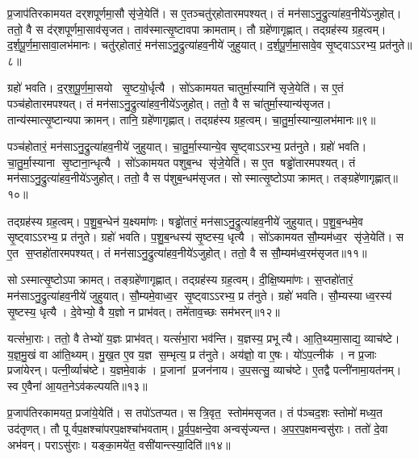 प्र॒जाप॑तिरकामयत दर्‌शपूर्णमा॒सौ सृ॑जे॒येति॑। स ए॒तञ्चतु॑र्‌होतारमपश्यत्। तं मन॑साऽनु॒द्रुत्या॑हव॒नीये॑ऽजुहोत्। ततो॒ वै स द॑र्‌शपूर्णमा॒साव॑सृजत। ताव॑स्मात्सृ॒ष्टावपाक्रामताम्। तौ ग्रहे॑णागृह्णात्। तद्ग्रह॑स्य ग्रह॒त्वम्। द॒र्श॒पू॒र्ण॒मा॒सावा॒लभ॑मानः। चतु॑र्‌होतारं॒ मन॑साऽनु॒द्रुत्या॑हव॒नीये॑ जुहुयात्। द॒र्श॒पू॒र्ण॒मा॒सावे॒व सृ॒ष्ट्वाऽऽरभ्य॒ प्रत॑नुते॥८॥

ग्रहो॑ भवति। द॒र्‌श॒पू॒र्ण॒मा॒सयो सृ॒ष्टयो॒र्धृत्यै। सो॑ऽकामयत चातुर्मा॒स्यानि॑ सृजे॒येति॑। स ए॒तं पञ्च॑होतारमपश्यत्। तं मन॑साऽनु॒द्रुत्या॑हव॒नीये॑ऽजुहोत्। ततो॒ वै स चा॑तुर्मा॒स्यान्य॑सृजत। तान्य॑स्मात्सृ॒ष्टान्यपाक्रामन्। तानि॒ ग्रहे॑णागृह्णात्। तद्ग्रह॑स्य ग्रह॒त्वम्। चा॒तु॒र्मा॒स्यान्या॒लभ॑मानः॥९॥

पञ्च॑होतारं॒ मन॑साऽनु॒द्रुत्या॑हव॒नीये॑ जुहुयात्। चा॒तु॒र्मा॒स्यान्ये॒व सृ॒ष्ट्वाऽऽरभ्य॒ प्रत॑नुते। ग्रहो॑ भवति। चा॒तु॒र्मा॒स्याना सृ॒ष्टाना॒न्धृत्यै। सो॑ऽकामयत पशुब॒न्ध सृ॑जे॒येति॑। स ए॒त षड्ढो॑तारमपश्यत्। तं मन॑साऽनु॒द्रुत्या॑हव॒नीये॑ऽजुहोत्। ततो॒ वै स प॑शुब॒न्धम॑सृजत। सोस्मात्सृ॒ष्टोऽपाक्रामत्। तङ्ग्रहे॑णागृह्णात्॥१०॥

तद्ग्रह॑स्य ग्रह॒त्वम्। प॒शु॒ब॒न्धेन॑ य॒क्ष्यमा॑णः। षड्ढो॑तारं॒ मन॑साऽनु॒द्रुत्या॑हव॒नीये॑ जुहुयात्। प॒शु॒ब॒न्धमे॒व सृ॒ष्ट्वाऽऽरभ्य॒ प्र त॑नुते। ग्रहो॑ भवति। प॒शु॒ब॒न्धस्य॑ सृ॒ष्टस्य॒ धृत्यै। सो॑ऽकामयत सौ॒म्यम॑ध्व॒र सृ॑जे॒येति॑। स ए॒त स॒प्तहो॑तारमपश्यत्। तं मन॑साऽनु॒द्रुत्या॑हव॒नीये॑ऽजुहोत्। ततो॒ वै स सौ॒म्यम॑ध्व॒रम॑सृजत॥११॥

सोऽस्मात्सृ॒ष्टोऽपाक्रामत्। तङ्ग्रहे॑णागृह्णात्। तद्ग्रह॑स्य ग्रह॒त्वम्। दी॒क्षि॒ष्यमा॑णः। स॒प्तहो॑तारं॒ मन॑साऽनु॒द्रुत्या॑हव॒नीये॑ जुहुयात्। सौ॒म्यमे॒वाध्व॒र सृ॒ष्ट्वाऽऽरभ्य॒ प्र त॑नुते। ग्रहो॑ भवति। सौ॒म्यस्याध्व॒रस्य॑ सृ॒ष्टस्य॒ धृत्यै। दे॒वेभ्यो॒ वै य॒ज्ञो न प्राभ॑वत्। तमे॑ताव॒च्छः सम॑भरन्॥१२॥

यत्सं॑भा॒राः। ततो॒ वै तेभ्यो॑ य॒ज्ञः प्राभ॑वत्। यत्सं॑भा॒रा भव॑न्ति। य॒ज्ञस्य॒ प्रभूत्यै। आ॒ति॒थ्यमा॒साद्य॒ व्याच॑ष्टे। य॒ज्ञ॒मु॒खं वा आ॑ति॒थ्यम्। मु॒ख॒त ए॒व य॒ज्ञ स॒म्भृत्य॒ प्र त॑नुते। अय॑ज्ञो॒ वा ए॒षः। यो॑ऽप॒त्नीक॑। न प्र॒जाः प्रजा॑येरन्। पत्नी॒र्व्याच॑ष्टे। य॒ज्ञमे॒वाक॑। प्र॒जानां प्र॒जन॑नाय। उ॒प॒सत्सु॒ व्याच॑ष्टे। ए॒तद्वै पत्नी॑नामा॒यत॑नम्। स्व ए॒वैना॑ आ॒यत॒नेऽव॑कल्पयति॥१३॥\anuvakamend[त॒नु॒त॒ आ॒लभ॑मानोऽगृह्णादसृजताभरञ्जायेर॒न्थ्षट्च॑]

प्र॒जाप॑तिरकामयत॒ प्रजा॑ये॒येति॑। स तपो॑ऽतप्यत। स त्रि॒वृत॒ स्तोम॑मसृजत। तं प॑ञ्चद॒शः स्तोमो॑ मध्य॒त उद॑तृणत्। तौ पूर्वप॒क्षश्चा॑परप॒क्षश्चा॑भवताम्। पू॒र्व॒प॒क्षन्दे॒वा अन्वसृ॑ज्यन्त। अ॒प॒र॒प॒क्षमन्वसु॑राः। ततो॑ दे॒वा अभ॑वन्। पराऽसु॑राः। यङ्का॒मये॑त॒ वसी॑यान्त्स्या॒दिति॑॥१४॥

